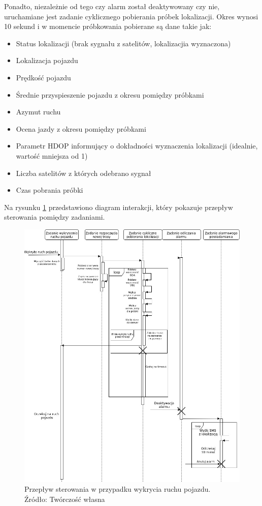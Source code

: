Ponadto, niezależnie od tego czy alarm został deaktywowany czy nie, uruchamiane jest zadanie cyklicznego pobierania próbek lokalizacji. Okres wynosi 10 sekund i w momencie próbkowania pobierane są dane takie jak:

\begin{itemize}
\item Status lokalizacji (brak sygnału z satelitów, lokalizacjia wyznaczona)
\item Lokalizacja pojazdu
\item Prędkość pojazdu
\item Średnie przyspieszenie pojazdu z okresu pomiędzy próbkami
\item Azymut ruchu
\item Ocena jazdy z okresu pomiędzy próbkami
\item Parametr HDOP informujący o dokładności wyznaczenia lokalizacji (idealnie, wartość mniejsza od 1)
\item Liczba satelitów z których odebrano sygnał
\item Czas pobrania próbki
\end{itemize}

Na rysunku \ref{fig:image_soft_mainboard_control_flow} przedstawiono diagram interakcji, który pokazuje przepływ sterowania pomiędzy zadaniami. 


\begin{figure}[H]
	\centering
	\includegraphics[width=17cm]{img/software/mainboard/MainBoardStartTracking.jpg}
	\caption{Przepływ sterowania w przypadku wykrycia ruchu pojazdu. 
	\\Źródło: Twórczość własna}
	\label{fig:image_soft_mainboard_control_flow}
\end{figure}